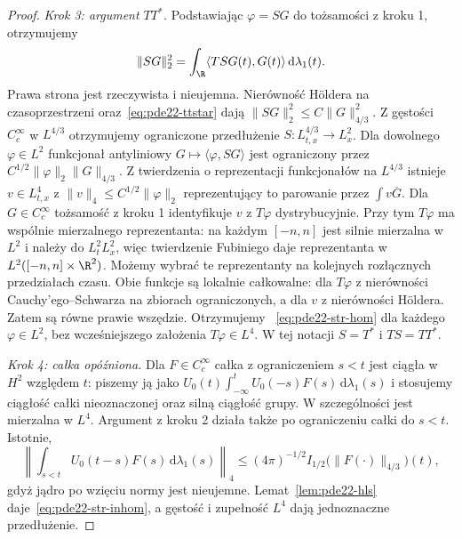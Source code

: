 \begin{proof}
\emph{Krok 3: argument $TT^*$.}
Podstawiając $\varphi=SG$ do tożsamości z kroku 1,
otrzymujemy
\[
 \|SG\|_2^2=\int_\R\langle TSG(t),G(t)\rangle
                         \,\mathrm d\lambda_1(t).
\]
Prawa strona jest rzeczywista i nieujemna.
Nierówność H\"oldera na czasoprzestrzeni
oraz~\eqref{eq:pde22-ttstar} dają
$\|SG\|_2^2\le C\|G\|_{4/3}^2$.
Z gęstości $C_c^\infty$ w $L^{4/3}$ otrzymujemy
ograniczone przedłużenie $S:L^{4/3}_{t,x}\to L^2_x$.
Dla dowolnego $\varphi\in L^2$ funkcjonał
antyliniowy $G\mapsto\langle\varphi,SG\rangle$
jest ograniczony przez $C^{1/2}\|\varphi\|_2\|G\|_{4/3}$.
Z twierdzenia o reprezentacji funkcjonałów na
$L^{4/3}$ istnieje $v\in L^4_{t,x}$ z
$\|v\|_4\le C^{1/2}\|\varphi\|_2$ reprezentujący
to parowanie przez $\int v\overline G$.
Dla $G\in C_c^\infty$ tożsamość z kroku 1
identyfikuje $v$ z $T\varphi$ dystrybucyjnie.
Przy tym $T\varphi$ ma wspólnie mierzalnego
reprezentanta: na każdym $[-n,n]$ jest silnie
mierzalna w $L^2$ i należy do $L^2_tL^2_x$,
więc twierdzenie Fubiniego daje reprezentanta
w $L^2([-n,n]\times\R^2)$. Możemy wybrać te
reprezentanty na kolejnych rozłącznych
przedziałach czasu. Obie funkcje są lokalnie
całkowalne: dla $T\varphi$ z nierówności
Cauchy'ego--Schwarza na zbiorach ograniczonych,
a dla $v$ z nierówności H\"oldera.
Zatem są równe prawie wszędzie. Otrzymujemy
~\eqref{eq:pde22-str-hom} dla każdego $\varphi\in L^2$,
bez wcześniejszego założenia $T\varphi\in L^4$.
W tej notacji $S=T^*$ i $TS=TT^*$.

\emph{Krok 4: całka opóźniona.}
Dla $F\in C_c^\infty$ całka z ograniczeniem
$s<t$ jest ciągła w $H^2$ względem $t$:
piszemy ją jako $U_0(t)\int_{-\infty}^t U_0(-s)F(s)\,
\mathrm d\lambda_1(s)$ i stosujemy ciągłość
całki nieoznaczonej oraz silną ciągłość grupy.
W szczególności jest mierzalna w $L^4$.
Argument z kroku 2 działa także po ograniczeniu
całki do $s<t$. Istotnie,
\[
 \left\|\int_{s<t}U_0(t-s)F(s)\,\mathrm d\lambda_1(s)\right\|_4
 \le (4\pi)^{-1/2}I_{1/2}
        \bigl(\|F(\cdot)\|_{4/3}\bigr)(t),
\]
gdyż jądro po wzięciu normy jest nieujemne.
Lemat~\ref{lem:pde22-hls} daje~\eqref{eq:pde22-str-inhom},
a gęstość i zupełność $L^4$ dają jednoznaczne
przedłużenie.


\end{proof}
